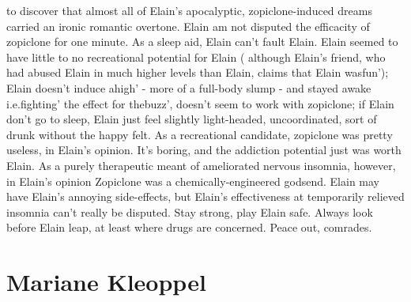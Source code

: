 \documentclass[12pt]{book}
\begin{document}
to discover that almost all of Elain's apocalyptic, zopiclone-induced dreams carried an ironic romantic overtone. Elain am not disputed the efficacity of zopiclone for one minute. As a sleep aid, Elain can't fault Elain. Elain seemed to have little to no recreational potential for Elain ( although Elain's friend, who had abused Elain in much higher levels than Elain, claims that Elain wasfun'); Elain doesn't induce ahigh' - more of a full-body slump - and stayed awake i.e.fighting' the effect for thebuzz', doesn't seem to work with zopiclone; if Elain don't go to sleep, Elain just feel slightly light-headed, uncoordinated, sort of drunk without the happy felt. As a recreational candidate, zopiclone was pretty useless, in Elain's opinion. It's boring, and the addiction potential just was worth Elain. As a purely therapeutic meant of ameliorated nervous insomnia, however, in Elain's opinion Zopiclone was a chemically-engineered godsend. Elain may have Elain's annoying side-effects, but Elain's effectiveness at temporarily relieved insomnia can't really be disputed. Stay strong, play Elain safe. Always look before Elain leap, at least where drugs are concerned. Peace out, comrades.



\chapter{Mariane Kleoppel}
\end{document}
